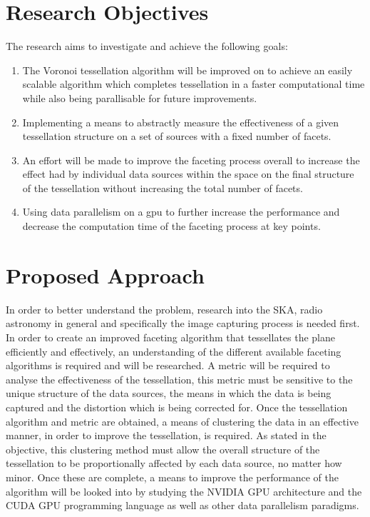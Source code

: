 \section{Research Objectives}
The research aims to investigate and achieve the following goals:
\begin{enumerate}
\item The Voronoi tessellation algorithm will be improved on to achieve an easily scalable algorithm which completes tessellation in a faster computational time while also being parallisable for future improvements.
\item Implementing a means to abstractly measure the effectiveness of a given tessellation structure on a set of sources with a fixed number of facets.
\item An effort will be made to improve the faceting process overall to increase the effect had by individual data sources within the space on the final structure of the tessellation without increasing the total number of facets.
\item Using data parallelism on a \gls{gpu} to further increase the performance and decrease the computation time of the faceting process at key points.
\end{enumerate}
\section{Proposed Approach}
In order to better understand the problem, research into the SKA, radio astronomy in general and specifically the image capturing process is needed first. In order to create an improved faceting algorithm that tessellates the plane efficiently and effectively, an understanding of the different available faceting algorithms is required and will be researched. A metric will be required to analyse the effectiveness of the tessellation, this metric must be sensitive to the unique structure of the data sources, the means in which the data is being captured and the distortion which is being corrected for. Once the tessellation algorithm and metric are obtained, a means of clustering the data in an effective manner, in order to improve the tessellation, is required. As stated in the objective, this clustering method must allow the overall structure of the tessellation to be proportionally affected by each data source, no matter how minor. Once these are complete, a means to improve the performance of the algorithm will be looked into by studying the NVIDIA GPU architecture and the CUDA GPU programming language as well as other data parallelism paradigms.
